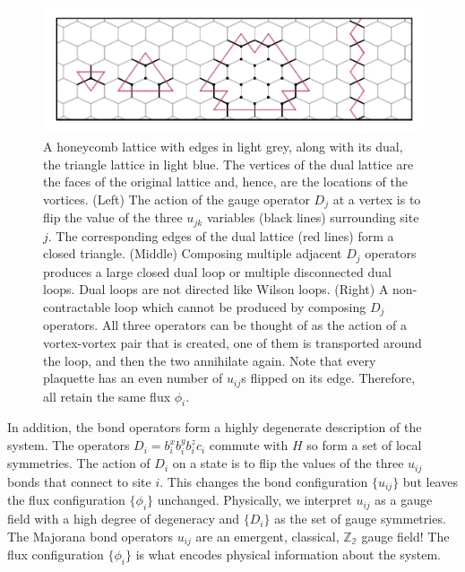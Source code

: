 \hypertarget{fig:gauge_symmetries}{%
\begin{figure}
\centering
\includegraphics[width=1\textwidth,height=\textheight]{figure_code/amk_chapter/intro/gauge_symmetries/gauge_symmetries}
\caption[{Gauge Symmetries}]{A honeycomb lattice with edges in light grey, along with its dual, the triangle lattice in light blue. The vertices of the dual lattice are the faces of the original lattice and, hence, are the locations of the vortices. (Left) The action of the gauge operator \(D_j\) at a vertex is to flip the value of the three \(u_{jk}\) variables (black lines) surrounding site \(j\). The corresponding edges of the dual lattice (red lines) form a closed triangle. (Middle) Composing multiple adjacent \(D_j\) operators produces a large closed dual loop or multiple disconnected dual loops. Dual loops are not directed like Wilson loops. (Right) A non-contractable loop which cannot be produced by composing \(D_j\) operators. All three operators can be thought of as the action of a vortex-vortex pair that is created, one of them is transported around the loop, and then the two annihilate again. Note that every plaquette has an even number of \(u_{ij}\)s flipped on its edge. Therefore, all retain the same flux \(\phi_i\).}
\label{fig:gauge_symmetries}
\end{figure}
}

In addition, the bond operators form a highly degenerate description of the system. The operators \(D_i = b^x_i b^y_i b^z_i c_i\) commute with \(H\) so form a set of local symmetries. The action of \(D_i\) on a state is to flip the values of the three \(u_{ij}\) bonds that connect to site \(i\). This changes the bond configuration \(\{u_{ij}\}\) but leaves the flux configuration \(\{\phi_i\}\) unchanged. Physically, we interpret \(u_{ij}\) as a gauge field with a high degree of degeneracy and \(\{D_i\}\) as the set of gauge symmetries. The Majorana bond operators \(u_{ij}\) are an emergent, classical, \(\mathbb{Z_2}\) gauge field! The flux configuration \(\{\phi_i\}\) is what encodes physical information about the system.

